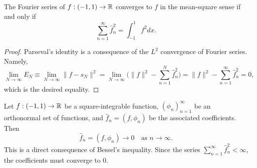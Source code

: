 \begin{theorem}
    The Fourier series of $f : (-1, 1) \to \mathbb{R}$ converges to $f$ in the mean-square sense if and only if
    \[\sum_{n=1}^{\infty} \hat{f}_n^2 = \int_{-1}^{1} f^2 dx.\]
\end{theorem}
\begin{proof}
    Parseval's identity is a consequence of the $L^2$ convergence of Fourier series. Namely,
    \[\lim_{N \to \infty} E_N \equiv \lim_{N \to \infty} \|f - s_N\|^2 = \lim_{N \to \infty} \Big(\|f\|^2 - \sum_{n=1}^{N} \hat{f}_n^2\Big) = \|f\|^2 - \sum_{n=1}^{\infty} \hat{f}_n^2 = 0,\]
    which is the desired equality.
\end{proof}

\begin{nremark}
    Let $f : (-1, 1) \to \mathbb{R}$ be a square-integrable function, $(\phi_n)_{n=1}^{\infty}$ be an orthonormal set of functions, and $\hat{f}_n = (f, \phi_n)$ be the associated coefficients. Then
    \[\hat{f}_n = (f, \phi_n) \to 0 \quad \text{as } n \to \infty.\]
    This is a direct consequence of Bessel's inequality. Since the series $\sum_{n=1}^{\infty} \hat{f}_n^2 < \infty$, the coefficients must converge to $0$.
\end{nremark}

